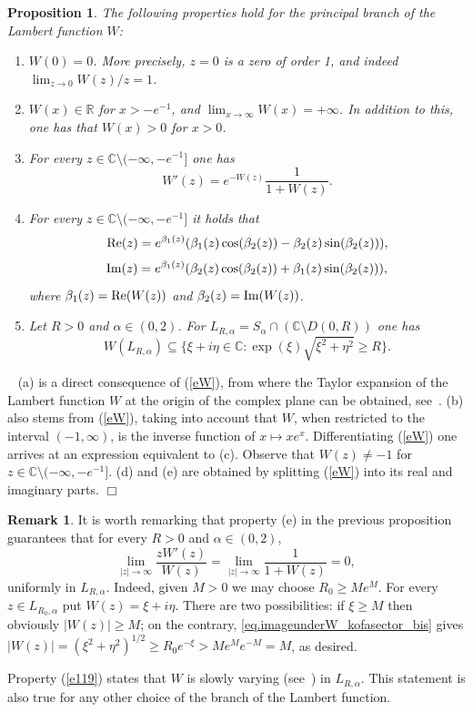 \documentclass[12pt,leqno]{amsart}
\newcommand{\R}{\mathbb{R}}
\def\C{\mathbb{C}}
\theoremstyle{plain}
\newtheorem{prop}[theo]{Proposition}
\theoremstyle{definition}
\newtheorem{rem}[theo]{Remark}
\numberwithin{equation}{section}
\def\Re{\mathop{\rm Re}\nolimits}      %
\def\Im{\mathop{\rm Im}\nolimits}
\newenvironment{proof1}{\medskip\par\noindent{\bf Proof}\ \normalfont}{\hfill $\Box$
\medskip\par}
\begin{document}
\begin{prop}\label{propW}
The following properties hold for the principal branch of the Lambert function $W$:
\begin{enumerate}
\item[(a)] $W(0)=0$. More precisely, $z=0$ is a zero of order 1, and indeed $\displaystyle\lim_{z\to 0}W(z)/z=1$.
\item[(b)] $W(x)\in\R$ for $x>-e^{-1}$, and $\lim_{x\to\infty}W(x)=+\infty$. In addition to this, one has that $W(x)>0$ for $x>0$.
\item[(c)] For every $z\in\C\setminus(-\infty,-e^{-1}]$ one has
$$W'(z)=e^{-W(z)}\frac{1}{1+W(z)}.$$
\item[(d)] For every $z\in\C\setminus(-\infty,-e^{-1}]$ it holds that
$$\Re(z)=e^{\beta_1(z)}(\beta_1(z)\cos(\beta_2(z))-\beta_2(z)\sin(\beta_2(z))),$$
$$\Im(z)=e^{\beta_1(z)}(\beta_2(z)\cos(\beta_2(z))+\beta_1(z)\sin(\beta_2(z))),$$
where $\beta_1(z)=\Re(W(z))$ and $\beta_2(z)=\Im(W(z))$.
\item[(e)] Let $R>0$ and $\alpha\in (0,2)$. For $L_{R,\alpha}=S_{\alpha}\cap (\C\setminus D(0,R))$ one has
\begin{equation}\label{eq.imageunderW_kofasector_bis}
W(L_{R,\alpha})\subseteq\{\xi+i\eta \in\mathbb{C}: \exp(\xi)\sqrt{\xi^2+\eta^2}\ge R\}.
\end{equation}
\end{enumerate}
\end{prop}
\begin{proof1}
(a) is a direct consequence of (\ref{eW}), from where the Taylor expansion of the Lambert function $W$ at the origin of the complex plane can be obtained, see~\cite{corless}. (b) also stems from (\ref{eW}), taking into account that $W$, when restricted to the interval $(-1,\infty)$, is the inverse function of $x\mapsto xe^x$. Differentiating (\ref{eW}) one arrives at an expression equivalent to (c). Observe that $W(z)\neq-1$ for $z\in\C\setminus(-\infty,-e^{-1}]$. (d) and (e) are obtained by splitting (\ref{eW}) into its real and imaginary parts.
\end{proof1}

\begin{rem}\label{remWslow}
It is worth remarking that property (e) in the previous proposition guarantees that for every $R>0$ and $\alpha\in(0,2)$,
\begin{equation}\label{e119}
\lim_{|z|\to\infty}\frac{zW'(z)}{W(z)}=\lim_{|z|\to\infty}\frac{1}{1+W(z)}=0,
\end{equation}
uniformly in $L_{R,\alpha}$. Indeed, given $M>0$ we may choose $R_0\ge Me^M$. For every $z\in L_{R_0,\alpha}$
put $W(z)=\xi +i\eta$. There are two possibilities: if $\xi\ge M$ then obviously $|W(z)|\ge M$; on the contrary, \eqref{eq.imageunderW_kofasector_bis} gives $|W(z)|=(\xi^2+\eta^2)^{1/2}\ge R_0e^{-\xi}>Me^Me^{-M}=M$, as desired.

Property (\ref{e119}) states that $W$ is slowly varying (see~\cite[Theorem~$A.1.2.(a)$]{bgt}) in $L_{R,\alpha}$. This statement is also true for any other choice of the branch of the Lambert function.
\end{rem}
\end{document}

